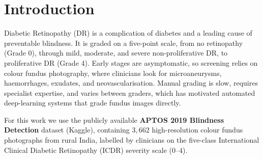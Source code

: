 \section{Introduction}
Diabetic Retinopathy (DR) is a complication of diabetes and a leading cause of preventable blindness. It is graded on a five-point scale, from no retinopathy (Grade 0), through mild, moderate, and severe non-proliferative DR, to proliferative DR (Grade 4). Early stages are asymptomatic, so screening relies on colour fundus photography, where clinicians look for microaneurysms, haemorrhages, exudates, and neovascularisation. Manual grading is slow, requires specialist expertise, and varies between graders, which has motivated automated deep-learning systems that grade fundus images directly.

For this work we use the publicly available \textbf{APTOS 2019 Blindness Detection} dataset (Kaggle), containing $3{,}662$ high-resolution colour fundus photographs from rural India, labelled by clinicians on the five-class International Clinical Diabetic Retinopathy (ICDR) severity scale ($0$--$4$).
